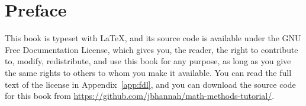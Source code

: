 \chapter{Preface}

This book is typeset with \LaTeX, and its source code is available under the
GNU Free Documentation License, which gives you, the reader, the right to
contribute to, modify, redistribute, and use this book for any purpose, as long
as you give the same rights to others to whom you make it available. You can
read the full text of the license in Appendix~\ref{app:fdl}, and you can
download the source code for this book from
\url{https://github.com/jbhannah/math-methods-tutorial/}.
